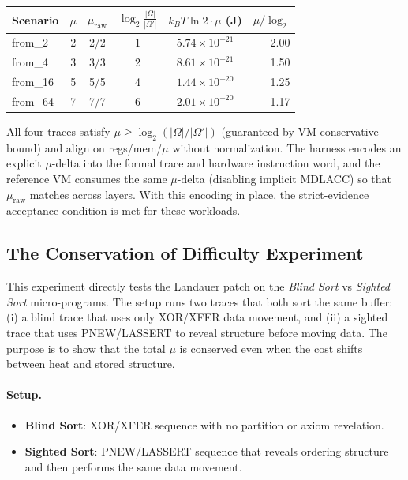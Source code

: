 {\tiny
\begin{center}
\begin{tabular}{@{}lccccr@{}}
\toprule
\textbf{Scenario} & $\mu$ & $\mu_{\text{raw}}$ & $\log_2\!\frac{|\Omega|}{|\Omega'|}$ & $k_BT\!\ln\!2\!\cdot\!\mu$ (J) & $\mu/\log_2$ \\
\midrule
from\_2 & 2 & 2/2 & 1 & $5.74\!\times\!10^{-21}$ & 2.00 \\
from\_4 & 3 & 3/3 & 2 & $8.61\!\times\!10^{-21}$ & 1.50 \\
from\_16 & 5 & 5/5 & 4 & $1.44\!\times\!10^{-20}$ & 1.25 \\
from\_64 & 7 & 7/7 & 6 & $2.01\!\times\!10^{-20}$ & 1.17 \\
\bottomrule
\end{tabular}
\end{center}
}

All four traces satisfy $\mu \ge \log_2(|\Omega|/|\Omega'|)$ (guaranteed by VM conservative bound) and align on regs/mem/$\mu$ without normalization. The harness encodes an explicit $\mu$-delta into the formal trace and hardware instruction word, and the reference VM consumes the same $\mu$-delta (disabling implicit MDLACC) so that $\mu_{\text{raw}}$ matches across layers. With this encoding in place, the strict-evidence acceptance condition is met for these workloads.

\subsection{The Conservation of Difficulty Experiment}
This experiment directly tests the Landauer patch on the \textit{Blind Sort} vs \textit{Sighted Sort} micro-programs. The setup runs two traces that both sort the same buffer: (i) a blind trace that uses only XOR/XFER data movement, and (ii) a sighted trace that uses PNEW/LASSERT to reveal structure before moving data. The purpose is to show that the total $\mu$ is conserved even when the cost shifts between heat and stored structure.

\paragraph{Setup.}
\begin{itemize}
    \item \textbf{Blind Sort}: XOR/XFER sequence with no partition or axiom revelation.
    \item \textbf{Sighted Sort}: PNEW/LASSERT sequence that reveals ordering structure and then performs the same data movement.
\end{itemize}

